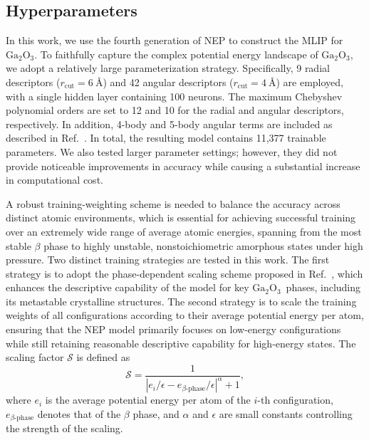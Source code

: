 \documentclass[%
reprint,
superscriptaddress,
 amsmath,amssymb,
 aps,
]{revtex4-2}
\newcommand{\ga}{$\text{Ga}_2\text{O}_3$}
\begin{document}
\subsection{Hyperparameters}

In this work, we use the fourth generation of NEP \cite{song_general-purpose_2024} to construct 
the MLIP for \ga. To faithfully capture the complex potential energy landscape of \ga, 
we adopt a relatively large parameterization strategy. 
Specifically, 9 radial descriptors ($r_\text{cut}=6~\text{\AA}$) and 
42 angular descriptors ($r_\text{cut}=4~\text{\AA}$) are employed, 
with a single hidden layer containing 100 neurons. 
The maximum Chebyshev polynomial orders are set to 12 and 10 for the radial and angular 
descriptors, respectively. 
In addition, 4-body and 5-body angular terms are included as described in Ref.~\cite{fan_gpumd_2022}. 
In total, the resulting model contains 11,377 trainable parameters. 
We also tested larger parameter settings; however, they did not provide noticeable improvements 
in accuracy while causing a substantial increase in computational cost.

A robust training-weighting scheme is needed to balance the accuracy across distinct atomic 
environments, which is essential for achieving successful training over an extremely wide range 
of average atomic energies, spanning from the most stable $\beta$ phase to highly unstable, nonstoichiometric 
amorphous states under high pressure. 
Two distinct training strategies are tested in this work. 
The first strategy is to adopt the phase-dependent scaling scheme proposed in Ref.~\cite{zhao_complex_2023}, 
which enhances the descriptive capability of the model for key \ga\ phases, including its 
metastable crystalline structures. 
The second strategy is to scale the training weights of all configurations according to their 
average potential energy per atom, ensuring that the NEP model primarily focuses on low-energy 
configurations while still retaining reasonable descriptive capability for high-energy states.
The scaling factor $\mathcal{S}$ is defined as
\begin{equation}
\label{eq:scaling}
\mathcal{S} = \frac{1}{\left|e_i/\epsilon - e_{\beta\text{-phase}}/\epsilon\right|^{\alpha} + 1},
\end{equation}
where $e_i$ is the average potential energy per atom of the $i$-th configuration, 
$e_{\beta\text{-phase}}$ denotes that of the $\beta$ phase, 
and $\alpha$ and $\epsilon$ are small constants controlling the strength of the scaling.
\end{document}
